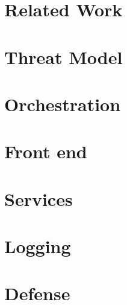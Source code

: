 \documentclass[letterpaper,twocolumn,10pt]{article}
\begin{document}
\section{Related Work} \label{Related Work}


\section{Threat Model} \label{Threat Model}


\section{Orchestration} \label{Orchestration}


\section{Front end} \label{Front End}


\section{Services} \label{Services}


\section{Logging} \label{Logging}


\section{Defense} \label{Defense}


\end{document}
